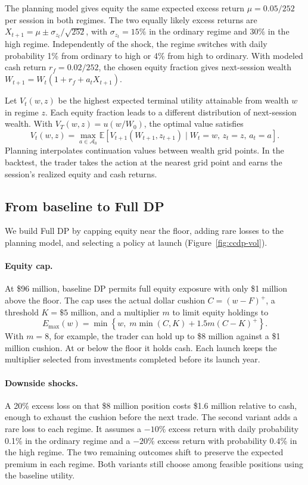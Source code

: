 \documentclass[10pt]{article}
\begin{document}
The planning model gives equity the same expected excess return $\mu=0.05/252$ per session in both regimes. The two equally likely excess returns are $X_{t+1}=\mu\pm\sigma_{z_t}/\sqrt{252}$, with $\sigma_{z_t}=15\%$ in the ordinary regime and $30\%$ in the high regime. Independently of the shock, the regime switches with daily probability 1\% from ordinary to high or 4\% from high to ordinary. With modeled cash return $r_f=0.02/252$, the chosen equity fraction gives next-session wealth $W_{t+1}=W_t(1+r_f+a_tX_{t+1})$.

Let $V_t(w,z)$ be the highest expected terminal utility attainable from wealth $w$ in regime $z$. Each equity fraction leads to a different distribution of next-session wealth. With $V_T(w,z)=u(w/W_0)$, the optimal value satisfies
\begin{equation}
 V_t(w,z)=\max_{a\in\mathcal A_0}
 \mathbb E\!\left[V_{t+1}(W_{t+1},z_{t+1})\mid W_t=w,\,z_t=z,\,a_t=a\right].
\end{equation}
Planning interpolates continuation values between wealth grid points. In the backtest, the trader takes the action at the nearest grid point and earns the session's realized equity and cash returns.

\subsection{From baseline to Full DP}
We build Full DP by capping equity near the floor, adding rare losses to the planning model, and selecting a policy at launch (Figure~\ref{fig:ccdp-vol}).

\paragraph{Equity cap.}
At \$96 million, baseline DP permits full equity exposure with only \$1 million above the floor. The cap uses the actual dollar cushion $C=(w-F)^+$, a threshold $K=\$5$ million, and a multiplier $m$ to limit equity holdings to
\begin{equation}
 E_{\max}(w)=\min\!\left\{w,\;m\min(C,K)+1.5m(C-K)^+\right\}.
\end{equation}
With $m=8$, for example, the trader can hold up to \$8 million against a \$1 million cushion. At or below the floor it holds cash. Each launch keeps the multiplier selected from investments completed before its launch year.

\paragraph{Downside shocks.}
A 20\% excess loss on that \$8 million position costs \$1.6 million relative to cash, enough to exhaust the cushion before the next trade. The second variant adds a rare loss to each regime. It assumes a $-10\%$ excess return with daily probability 0.1\% in the ordinary regime and a $-20\%$ excess return with probability 0.4\% in the high regime. The two remaining outcomes shift to preserve the expected premium in each regime. Both variants still choose among feasible positions using the baseline utility.
\end{document}
